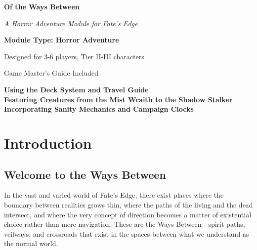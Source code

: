 \documentclass[11pt]{article}
\begin{document}
\begin{titlepage}
\centering
\vspace*{2cm}

{\Huge\bfseries\color{headercolor} Of the Ways Between} 

\vspace{0.5cm}

{\Large\itshape A Horror Adventure Module for Fate's Edge}

\vspace{2cm}

\vspace{2cm}

{\Large\bfseries Module Type: Horror Adventure}

\vspace{1cm}

{\large Designed for 3-6 players, Tier II-III characters}

\vspace{1cm}

{\large Game Master's Guide Included}

\vfill

{\large 
\textbf{Using the Deck System and Travel Guide} \\
\textbf{Featuring Creatures from the Mist Wraith to the Shadow Stalker} \\
\textbf{Incorporating Sanity Mechanics and Campaign Clocks}
}

\end{titlepage}

\newpage

\tableofcontents

\newpage

\section{Introduction}

\subsection{Welcome to the Ways Between}

In the vast and varied world of Fate's Edge, there exist places where the boundary between realities grows thin, where the paths of the living and the dead intersect, and where the very concept of direction becomes a matter of existential choice rather than mere navigation. These are the Ways Between - spirit paths, veilways, and crossroads that exist in the spaces between what we understand as the normal world.
\end{document}
